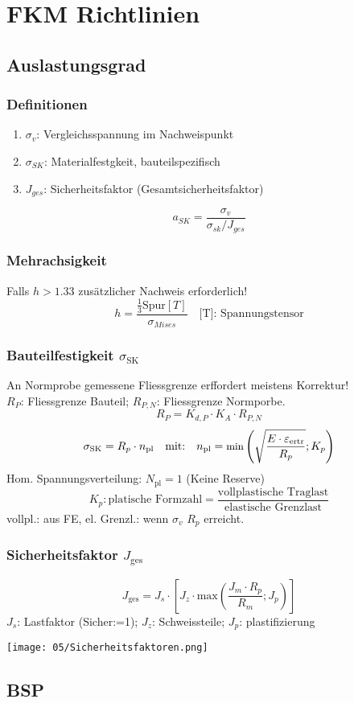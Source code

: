 \section{FKM Richtlinien}{}
    \subsection{Auslastungsgrad}
     
        \subsubsection{Definitionen}
            \begin{enumerate}[noitemsep]
                \item $\sigma_{v}$: Vergleichsspannung im Nachweispunkt
                \item $\sigma_{SK}$: Materialfestgkeit, bauteilspezifisch
                \item $J_{ges}$: Sicherheitsfaktor (Gesamtsicherheitsfaktor)
            \end{enumerate}
            \[a_{SK} = \frac{\sigma_{v}}{\sigma_{sk}/J_{ges}} \]
    
        \subsubsection{Mehrachsigkeit}
            Falls $h > 1.33$ zusätzlicher Nachweis erforderlich! 
            \[ h = \frac{\frac{1}{3} \textrm{Spur}[T]}{\sigma_{Mises}} \quad \textrm{[T]: Spannungstensor}\]
        \subsubsection{Bauteilfestigkeit $\sigma_{\textrm{SK}}$}
            An Normprobe gemessene Fliessgrenze erffordert meistens Korrektur! \\$R_P$: Fliessgrenze Bauteil; $R_{P,N}$: Fliessgrenze Normporbe.
            \[R_P = K_{d,P}\cdot K_A\cdot R_{P,N}\]
            \[\sigma_{\textrm{SK}}=R_p\cdot n_{\textrm{pl}} \quad\textrm{mit:}\quad \small n_{\textrm{pl}}=\textrm{min} \left( \sqrt{ \frac{E\cdot\varepsilon_{\textrm{ertr}}}{R_p}};K_p \right) \]\normalsize
            Hom. Spannungsverteilung: $N_{\textrm{pl}}=1$ (Keine Reserve)
            \[K_p: \textrm{platische Formzahl} = \frac{\textrm{vollplastische Traglast}}{\textrm{elastische Grenzlast}}\]
            vollpl.: aus FE, el. Grenzl.: wenn $\sigma_v$ $R_p$ erreicht.
        \subsubsection{Sicherheitsfaktor $J_{\textrm{ges}}$}
        \small\[J_{\textrm{ges}}= J_s \cdot \left[ J_z \cdot \textrm{max}\left(\frac{J_m \cdot R_p}{R_m}; J_p \right) \right] \]\normalsize
        $J_s$: Lastfaktor (Sicher:=1); $J_z$: Schweissteile; $J_p$: plastifizierung
        \begin{center}
            \texttt{[image: 05/Sicherheitsfaktoren.png]}
        \end{center}
    
    \subsection{BSP}
